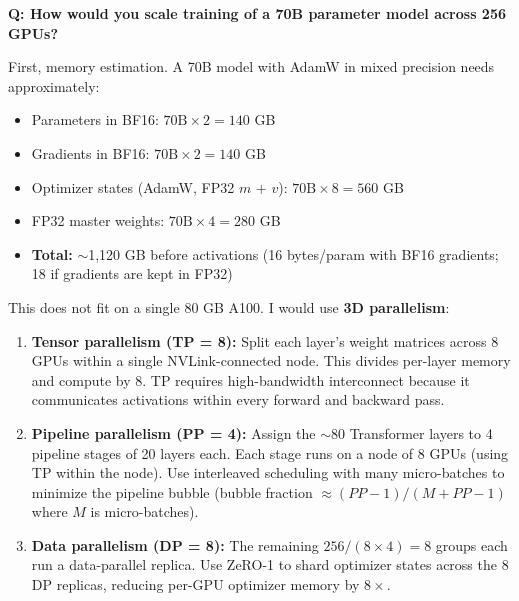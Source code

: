 \begin{interviewq}
\textbf{Q: How would you scale training of a 70B parameter model across 256 GPUs?}

 \quad {} \quad \badgefreq{\freqhigh}

\stronganswer

First, memory estimation. A 70B model with AdamW in mixed precision needs approximately:
\begin{itemize}
    \item Parameters in BF16: $70\text{B} \times 2 = 140$ GB
    \item Gradients in BF16: $70\text{B} \times 2 = 140$ GB
    \item Optimizer states (AdamW, FP32 $m$ + $v$): $70\text{B} \times 8 = 560$ GB
    \item FP32 master weights: $70\text{B} \times 4 = 280$ GB
    \item \textbf{Total:} $\sim$1,120 GB before activations (16 bytes/param with BF16 gradients; 18 if gradients are kept in FP32)
\end{itemize}

This does not fit on a single 80 GB A100. I would use \textbf{3D parallelism}:

\begin{enumerate}
    \item \textbf{Tensor parallelism (TP = 8):} Split each layer's weight matrices across 8 GPUs within a single NVLink-connected node. This divides per-layer memory and compute by 8. TP requires high-bandwidth interconnect because it communicates activations within every forward and backward pass.

    \item \textbf{Pipeline parallelism (PP = 4):} Assign the $\sim$80 Transformer layers to 4 pipeline stages of 20 layers each. Each stage runs on a node of 8 GPUs (using TP within the node). Use interleaved scheduling with many micro-batches to minimize the pipeline bubble (bubble fraction $\approx (PP-1)/(M + PP - 1)$ where $M$ is micro-batches).

    \item \textbf{Data parallelism (DP = 8):} The remaining $256 / (8 \times 4) = 8$ groups each run a data-parallel replica. Use ZeRO-1 to shard optimizer states across the 8 DP replicas, reducing per-GPU optimizer memory by $8\times$.
\end{enumerate}


\end{interviewq}
